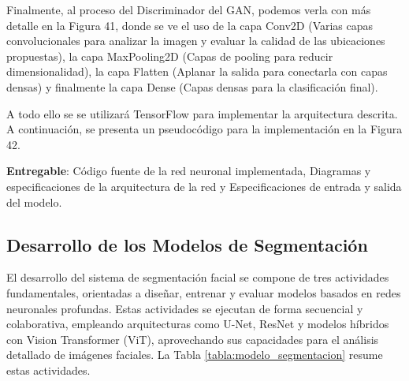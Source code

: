  Finalmente, al proceso del Discriminador del GAN, podemos verla con más detalle en la Figura 41, donde se ve el uso de la capa Conv2D (Varias capas convolucionales para analizar la imagen y evaluar la calidad de las ubicaciones propuestas), la capa MaxPooling2D (Capas de pooling para reducir dimensionalidad), la capa Flatten (Aplanar la salida para conectarla con capas densas) y finalmente la capa Dense (Capas densas para la clasificación final).
 
 
 A todo ello se se utilizará TensorFlow para implementar la arquitectura descrita. A continuación, se presenta un pseudocódigo para la implementación en la Figura 42.
 
 
 \textbf{Entregable}: Código fuente de la red neuronal implementada, Diagramas y especificaciones de la arquitectura de la red y Especificaciones de entrada y salida del modelo.

 



\subsection{Desarrollo de los Modelos de Segmentación}
El desarrollo del sistema de segmentación facial se compone de tres actividades fundamentales, orientadas a diseñar, entrenar y evaluar modelos basados en redes neuronales profundas. Estas actividades se ejecutan de forma secuencial y colaborativa, empleando arquitecturas como U-Net, ResNet y modelos híbridos con Vision Transformer (ViT), aprovechando sus capacidades para el análisis detallado de imágenes faciales. La Tabla \ref{tabla:modelo_segmentacion} resume estas actividades.

